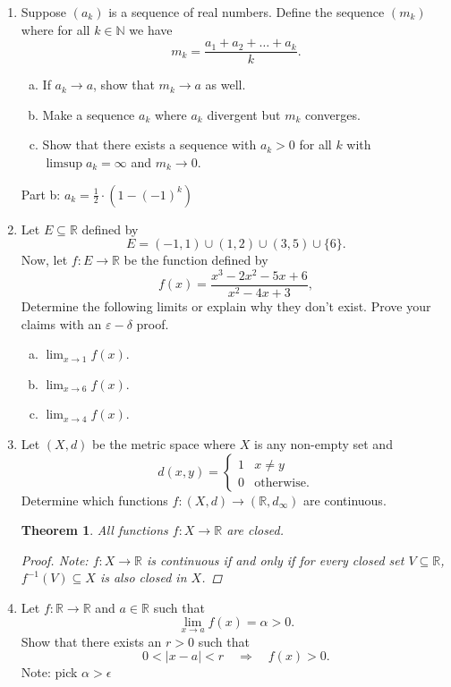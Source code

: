\documentclass{amsart}
\newtheorem{theorem}{Theorem}
\begin{document}
\begin{enumerate}[1.]
\newpage
\item Suppose $(a_k)$ is a sequence of real numbers. Define the sequence $(m_k)$ where for all $k \in \mathbb{N}$ we have
\[ m_k= \frac{a_1+a_2+\dots+ a_k}{k}.\]
\begin{enumerate}[(a)]
\item If $a_k \to a$, show that $m_k\to a$ as well.
\item Make a sequence $a_k$ where $a_k$ divergent but $m_k$ converges.
\item Show that there exists a sequence with $a_k>0$ for all $k$ with $\limsup a_k=\infty$ and $m_k\to 0.$
\end{enumerate}
Part b: $a_k = \frac{1}{2} \cdot (1 - (-1)^k)$


\newpage
\item Let $E \subseteq \mathbb{R}$ defined by 
\[ E = (-1,1) \cup (1,2) \cup (3,5) \cup \{6\}.\]
Now, let $f: E \to \mathbb{R}$ be the function defined by 
\[ f(x)=\frac{x^3-2x^2-5x+6}{x^2-4x+3},\]
Determine the following limits or explain why they don't exist. Prove your claims with an $\varepsilon-\delta$ proof. 
\begin{enumerate}[(a)]
\item $\displaystyle \lim_{x\to 1} f(x)$.
\item $\displaystyle \lim_{x\to 6} f(x)$.
\item $\displaystyle \lim_{x\to 4} f(x)$.
\end{enumerate}

\newpage
\item  Let $(X,d)$ be the metric space where $X$ is any non-empty set and
\[ d(x,y) = \begin{cases} 1 & x\neq y \\ 
                          0 & \text{otherwise.}
                          \end{cases}\]
Determine which functions $f: (X,d) \rightarrow (\mathbb{R},d_{\infty})$ are continuous. 
\begin{theorem}
    All functions $f: X \to \mathbb{R}$ are closed.
    \begin{proof}
        Note: $f: X \to \mathbb{R}$ is continuous if and only if for every closed set $V \subseteq \mathbb{R}$, $f^{-1}(V) \subseteq X$ is also closed in $X$. 
    \end{proof}
\end{theorem}
\newpage
\item  Let $f:\mathbb{R} \to \mathbb{R}$ and $a \in \mathbb{R}$ such that
\[ \lim_{x \to a} f(x) = \alpha > 0.\]
Show that there exists an $r>0$ such that 
\[ 0 < |x-a|<r \quad \Rightarrow \quad f(x) > 0.\]
Note: pick $\alpha > \epsilon$

\end{enumerate}
\end{document}

